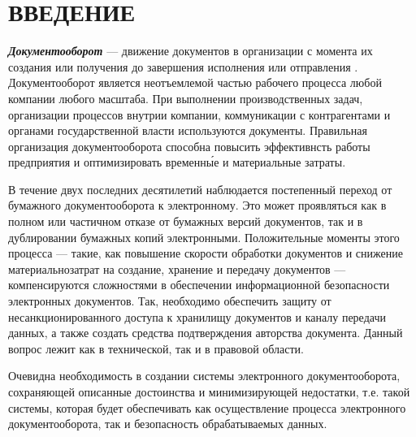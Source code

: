 \chapter*{ВВЕДЕНИЕ}							%

\textbf{\textit{Документооборот}} --- движение документов в организации с момента их создания или получения до завершения исполнения или отправления \cite{gost51141}.
Документооборот является неотъемлемой частью рабочего процесса любой компании любого масштаба. При выполнении производственных задач, организации процессов внутрии компании, коммуникации с контрагентами и органами государственной власти используются документы. Правильная организация документооборота способна повысить эффективнсть работы предприятия и оптимизировать временн\'{ы}е и материальные затраты.

\vspace{\baselineskip}
В течение двух последних десятилетий наблюдается постепенный переход от бумажного документооборота к электронному. Это может проявляться как в полном или частичном отказе от бумажных версий документов, так и в дублировании бумажных копий электронными. Положительные моменты этого процесса --- такие, как повышение скорости обработки документов и снижение материально затрат на создание, хранение и передачу документов --- компенсируются сложностями в обеспечении информационной безопасности электронных документов. Так, необходимо обеспечить защиту от несанкционированного доступа к хранилищу документов и каналу передачи данных, а также создать средства подтверждения авторства документа. Данный вопрос лежит как в технической, так и в правовой области.

\vspace{\baselineskip}
Очевидна необходимость в создании системы электронного документооборота, сохраняющей описанные достоинства и минимизирующей недостатки, т.е. такой системы, которая будет обеспечивать как осуществление процесса электронного документооборота, так и безопасность обрабатываемых данных.

